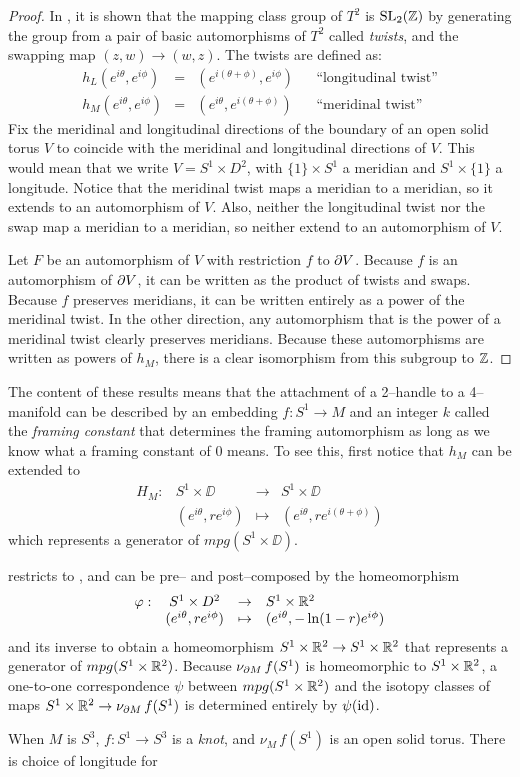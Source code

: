 \begin{proof}
	In \cite{Rolf76}, it is shown that the mapping class group of $T^2$ is $\textrm{SL}_2(\mathbb{Z})$ by generating the group from a pair of basic automorphisms of $T^2$ called \emph{twists}, and the swapping map $(z,w)\to(w,z)$.
	The twists are defined as:
	\[
	\begin{array}{ccccc}
	h_L(e^{i\theta},e^{i\phi}) & = & (e^{i(\theta+\phi)},e^{i\phi}) & & \textrm{``longitudinal twist''} \\
	
	h_M(e^{i\theta},e^{i\phi}) & = & (e^{i\theta},e^{i(\theta+\phi)}) & & \textrm{``meridinal twist''}	
	\end{array}
	\]
	Fix the meridinal and longitudinal directions of the boundary of an open solid torus $V$ to coincide with the meridinal and longitudinal directions of $V$.
	This would mean that we write $V=S^1\times D^2$, with $\{1\}\times S^1$ a meridian and $S^1\times\{1\}$ a longitude.
	Notice that the meridinal twist maps a meridian to a meridian, so it extends to an automorphism of $V$.
	Also, neither the longitudinal twist nor the swap map a meridian to a meridian, so neither extend to an automorphism of $V$.
	
	Let $F$ be an automorphism of $V$ with restriction $f$ to $\partial V$.
	Because $f$ is an automorphism of $\partial V$, it can be written as the product of twists and swaps.
	Because $f$ preserves meridians, it can be written entirely as a power of the meridinal twist.
	In the other direction, any automorphism that is the power of a meridinal twist clearly preserves meridians.
	Because these automorphisms are written as powers of $h_M$, there is a clear isomorphism from this subgroup to $\mathbb{Z}$.
\end{proof}

The content of these results means that the attachment of a 2--handle to a 4--manifold can be described by an embedding $f:S^1\to M$ and an integer $k$ called the \emph{framing constant} that determines the framing automorphism as long as we know what a framing constant of $0$ means.
To see this, first notice that $h_M$ can be extended to
\[
	\begin{array}{cccc}
		H_M: & S^1\times\DD & \to & S^1\times\DD \\
			& (e^{i\theta}, re^{i\phi}) & \mapsto & (e^{i\theta},re^{i(\theta+\phi)})	
	\end{array}
\]
which represents a generator of $mpg(S^1\times\DD)$.


 restricts to , and can be pre-- and post--composed by the homeomorphism
\[
	\begin{array}{cccl}
		\varphi: & S^1\times D^2 & \to & S^1\times \mathbb{R}^2 \\
				 & (e^{i\theta}, re^{i\phi}) & \mapsto & (e^{i\theta}, -\ln(1-r)e^{i\phi})
	\end{array}	
\]
and its inverse to obtain a homeomorphism $S^1\times \mathbb{R}^2\to S^1\times \mathbb{R}^2$ that represents a generator of $mpg(S^1\times\mathbb{R}^2)$.
Because $\nu_{\partial M}\,f(S^1)$ is homeomorphic to $S^1\times\mathbb{R}^2$, a one-to-one correspondence
$\psi$ between $mpg(S^1\times\mathbb{R}^2)$ and the isotopy classes of maps $S^1\times\mathbb{R}^2\to\nu_{\partial M}\,f(S^1)$ is determined entirely by $\psi(\mathrm{id})$.

When $M$ is $S^3$, $f:S^1\to S^3$ is a \emph{knot}, and $\nu_M\,f(S^1)$ is an open solid torus.
There is choice of longitude for 
